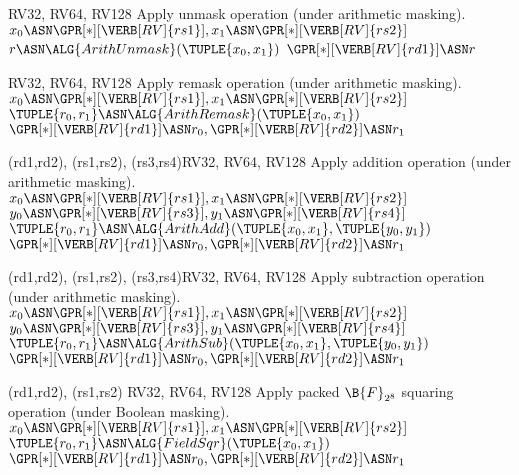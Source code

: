 
                 {RV32, RV64, RV128}{
  Apply       unmask operation 
  (under arithmetic masking).
}{
  $x_0 \ASN \GPR[*][{\VERB[RV]{rs1}}], x_1 \ASN \GPR[*][{\VERB[RV]{rs2}}]$ \;
  $        r          \ASN \ALG{ArithUnmask}( \TUPLE{ x_0, x_1 } )$ \;
  $\GPR[*][{\VERB[RV]{rd1}}] \ASN r                                      $ \;    
}


           {RV32, RV64, RV128}{
  Apply       remask operation 
  (under arithmetic masking).
}{
  $x_0 \ASN \GPR[*][{\VERB[RV]{rs1}}], x_1 \ASN \GPR[*][{\VERB[RV]{rs2}}]$ \;
  $\TUPLE{ r_0, r_1 } \ASN \ALG{ArithRemask}( \TUPLE{ x_0, x_1 } )$ \;
  $\GPR[*][{\VERB[RV]{rd1}}] \ASN r_0, \GPR[*][{\VERB[RV]{rd2}}] \ASN r_1$ \;  
}


   {(rd1,rd2), (rs1,rs2), (rs3,rs4)}{RV32, RV64, RV128}{
  Apply     addition operation 
  (under arithmetic masking).
}{
  $x_0 \ASN \GPR[*][{\VERB[RV]{rs1}}], x_1 \ASN \GPR[*][{\VERB[RV]{rs2}}]$ \;
  $y_0 \ASN \GPR[*][{\VERB[RV]{rs3}}], y_1 \ASN \GPR[*][{\VERB[RV]{rs4}}]$ \;
  $\TUPLE{ r_0, r_1 } \ASN \ALG{ArithAdd}( \TUPLE{ x_0, x_1 }, \TUPLE{ y_0, y_1 } )$ \;
  $\GPR[*][{\VERB[RV]{rd1}}] \ASN r_0, \GPR[*][{\VERB[RV]{rd2}}] \ASN r_1$ \;
}


   {(rd1,rd2), (rs1,rs2), (rs3,rs4)}{RV32, RV64, RV128}{
  Apply  subtraction operation 
  (under arithmetic masking).
}{
  $x_0 \ASN \GPR[*][{\VERB[RV]{rs1}}], x_1 \ASN \GPR[*][{\VERB[RV]{rs2}}]$ \;
  $y_0 \ASN \GPR[*][{\VERB[RV]{rs3}}], y_1 \ASN \GPR[*][{\VERB[RV]{rs4}}]$ \;
  $\TUPLE{ r_0, r_1 } \ASN \ALG{ArithSub}( \TUPLE{ x_0, x_1 }, \TUPLE{ y_0, y_1 } )$ \;
  $\GPR[*][{\VERB[RV]{rd1}}] \ASN r_0, \GPR[*][{\VERB[RV]{rd2}}] \ASN r_1$ \;
}


   {(rd1,rd2), (rs1,rs2)           }{RV32, RV64, RV128}{
  Apply packed $\B{F}_{2^8}$ squaring         operation 
  (under Boolean    masking).
}{
  $x_0 \ASN \GPR[*][{\VERB[RV]{rs1}}], x_1 \ASN \GPR[*][{\VERB[RV]{rs2}}]$ \;
  $\TUPLE{ r_0, r_1 } \ASN \ALG{FieldSqr}( \TUPLE{ x_0, x_1 }                     )$ \;
  $\GPR[*][{\VERB[RV]{rd1}}] \ASN r_0, \GPR[*][{\VERB[RV]{rd2}}] \ASN r_1$ \;
}

